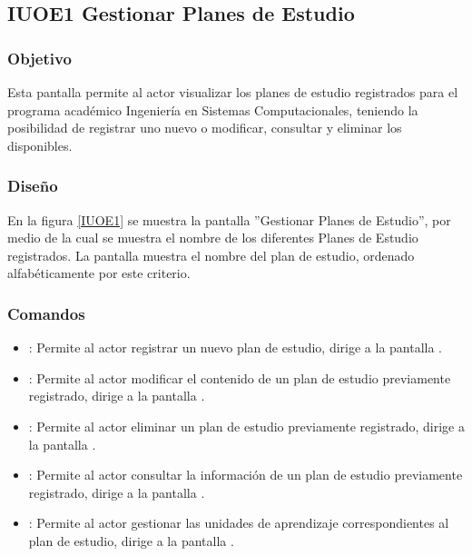 \subsection{IUOE1 Gestionar Planes de Estudio}

\subsubsection{Objetivo}
	
	Esta pantalla permite al actor visualizar los planes de estudio registrados para el programa académico Ingeniería en Sistemas Computacionales, teniendo la posibilidad de registrar uno nuevo o modificar, consultar y eliminar los disponibles.

\subsubsection{Diseño}

    En la figura \ref{IUOE1} se muestra la pantalla ''Gestionar Planes de Estudio'', por medio de la cual se muestra el nombre de los diferentes Planes de Estudio registrados. La pantalla muestra el nombre del plan de estudio, ordenado alfabéticamente por este criterio.
 

\subsubsection{Comandos}
    \begin{itemize}
		\item \btnRegistrar: Permite al actor registrar un nuevo plan de estudio, dirige a la pantalla .
		
		\item {}: Permite al actor modificar el contenido de un plan de estudio previamente registrado, dirige a la pantalla .
		
		\item {}: Permite al actor eliminar un plan de estudio previamente registrado, dirige a la pantalla .
		
		\item {}: Permite al actor consultar la información de un plan de estudio previamente registrado, dirige a la pantalla .
		
		\item {}: Permite al actor gestionar las unidades de aprendizaje correspondientes al plan de estudio, dirige a la pantalla .
		
    \end{itemize}
